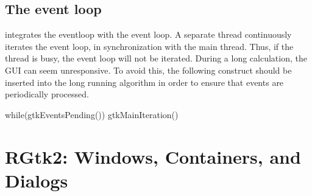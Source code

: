 
\section{The event loop}


 integrates the \GTK\/ eventloop with the \R\/ event
loop. A separate thread continuously iterates the \GTK\/ event loop,
in synchronization with the main \R\/ thread.  Thus, if the \R\/
thread is busy, the \GTK\/ event loop will not be iterated. During a
long calculation, the GUI can seem unresponsive. To avoid this, the
following construct should be inserted into the long running algorithm
in order to ensure that \GTK\/ events are periodically processed.

\begin{Schunk}
\begin{Sinput}
 while(gtkEventsPending()) 
   gtkMainIteration()
\end{Sinput}
\end{Schunk}







\chapter{RGtk2: Windows, Containers, and Dialogs}
\label{sec:top-level-windows}

